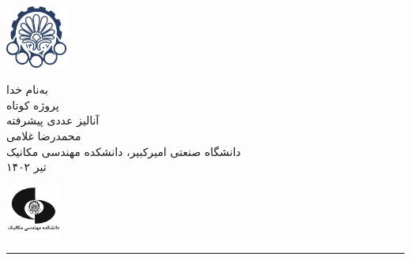 \begin{minipage}{0.1\textwidth}
\includegraphics[width=2cm]{figs/logo.png}
\end{minipage}%
\hfill%
\begin{minipage}{0.6\textwidth}\centering
\fontsize{10pt}{10pt}\selectfont
به‌نام خدا \\
پروژه کوتاه \\
آنالیز عددی پیشرفته \\
محمدرضا غلامی \\
\vspace{0.25cm}
\begingroup
\fontsize{8pt}{8pt}\selectfont
دانشگاه صنعتی امیرکبیر، دانشکده مهندسی مکانیک \\
تیر ۱۴۰۲ \\
\endgroup
\end{minipage}%
\hfill%
\begin{minipage}{0.1\textwidth}
\includegraphics[width=1.8cm]{figs/images.png}
\end{minipage}

\vspace{0.5cm}

\noindent\rule{\textwidth}{1pt}